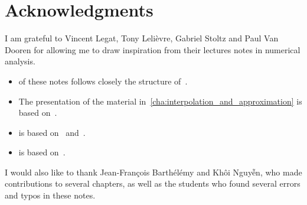 \chapter*{Acknowledgments}%
\label{cha:acknowledgements}

I am grateful to Vincent Legat, Tony Lelièvre, Gabriel Stoltz and Paul Van Dooren for allowing me to draw inspiration from their lectures notes in numerical analysis.
\begin{itemize}
    \item
         of these notes follows closely the structure of~\cite[Chapter 3]{VanDooren}.

    \item
        The presentation of the material in~\cref{cha:interpolation_and_approximation} is based on~\cite{Legat}.

    \item
         is based on~\cite[Chapter 2]{cs} and~\cite[Chapter 5]{VanDooren}.

    \item
         is based on~\cite[Chapter 3]{cs}.
\end{itemize}
I would also like to thank Jean-François Barthélémy and Kh\^oi Nguy\~{\^e}n,
who made contributions to several chapters,
as well as the students who found several errors and typos in these notes.
